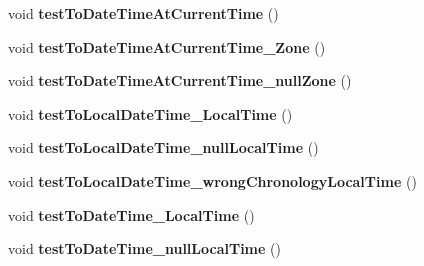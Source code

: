 \begin{DoxyCompactItemize}
\item 
\hypertarget{classorg_1_1joda_1_1time_1_1_test_local_date___basics_ad12a65f4f2eb617fcb2b27ca58d6ecb3}{void {\bfseries test\-To\-Date\-Time\-At\-Current\-Time} ()}\label{classorg_1_1joda_1_1time_1_1_test_local_date___basics_ad12a65f4f2eb617fcb2b27ca58d6ecb3}

\item 
\hypertarget{classorg_1_1joda_1_1time_1_1_test_local_date___basics_a102381d2a315c8db26318eb9beee9f38}{void {\bfseries test\-To\-Date\-Time\-At\-Current\-Time\-\_\-\-Zone} ()}\label{classorg_1_1joda_1_1time_1_1_test_local_date___basics_a102381d2a315c8db26318eb9beee9f38}

\item 
\hypertarget{classorg_1_1joda_1_1time_1_1_test_local_date___basics_a9f3932f0051cd214f3d3434c3fc59819}{void {\bfseries test\-To\-Date\-Time\-At\-Current\-Time\-\_\-null\-Zone} ()}\label{classorg_1_1joda_1_1time_1_1_test_local_date___basics_a9f3932f0051cd214f3d3434c3fc59819}

\item 
\hypertarget{classorg_1_1joda_1_1time_1_1_test_local_date___basics_a7aac02e660abda916ef6497c55c7b19e}{void {\bfseries test\-To\-Local\-Date\-Time\-\_\-\-Local\-Time} ()}\label{classorg_1_1joda_1_1time_1_1_test_local_date___basics_a7aac02e660abda916ef6497c55c7b19e}

\item 
\hypertarget{classorg_1_1joda_1_1time_1_1_test_local_date___basics_a7881a461dcbd6fe49540be40edd72a54}{void {\bfseries test\-To\-Local\-Date\-Time\-\_\-null\-Local\-Time} ()}\label{classorg_1_1joda_1_1time_1_1_test_local_date___basics_a7881a461dcbd6fe49540be40edd72a54}

\item 
\hypertarget{classorg_1_1joda_1_1time_1_1_test_local_date___basics_afa58bf03d0f77af5b1e10793666d2e4e}{void {\bfseries test\-To\-Local\-Date\-Time\-\_\-wrong\-Chronology\-Local\-Time} ()}\label{classorg_1_1joda_1_1time_1_1_test_local_date___basics_afa58bf03d0f77af5b1e10793666d2e4e}

\item 
\hypertarget{classorg_1_1joda_1_1time_1_1_test_local_date___basics_abeeab5851595050e702a28b803723879}{void {\bfseries test\-To\-Date\-Time\-\_\-\-Local\-Time} ()}\label{classorg_1_1joda_1_1time_1_1_test_local_date___basics_abeeab5851595050e702a28b803723879}

\item 
\hypertarget{classorg_1_1joda_1_1time_1_1_test_local_date___basics_aa602ed5302b2b914fbacd32f4fc7df22}{void {\bfseries test\-To\-Date\-Time\-\_\-null\-Local\-Time} ()}\label{classorg_1_1joda_1_1time_1_1_test_local_date___basics_aa602ed5302b2b914fbacd32f4fc7df22}


\end{DoxyCompactItemize}
